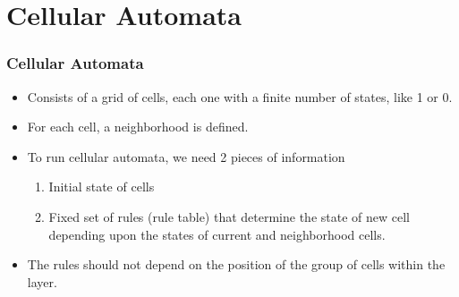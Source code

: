\documentclass{beamer}
\begin{document}
\section{Cellular Automata}
\begin{frame}
    \frametitle{Cellular Automata}
    \begin{itemize}
        \item Consists of a grid of cells, each one with a finite number of states, like 1 or 0.
        \item For each cell, a neighborhood is defined.
        \item To run cellular automata, we need 2 pieces of information 
        \begin{enumerate}
            \item Initial state of cells 
            \item Fixed set of rules (rule table) that determine the state of new cell depending upon the states of current and neighborhood cells.
        \end{enumerate}
        \item The rules should not depend on the position of the group of cells within the layer.
    \end{itemize}
\end{frame}

\end{document}
